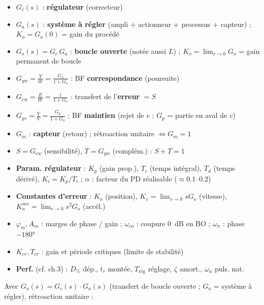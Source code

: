 
\begin{tcolorbox}[colback=ch6teal!5,colframe=ch6teal!80!black,title={Notations (rappel cours)}]
\begin{itemize}
  \item $G_c(s)$ : \textbf{r\'egulateur} (correcteur)
  \item $G_a(s)$ : \textbf{syst\`eme \`a r\'egler} (ampli + actionneur + processus + capteur) ; $K_a{=}G_a(0)$ = gain du proc\'ed\'e
  \item $G_o(s)=G_c\,G_a$ : \textbf{boucle ouverte} (not\'ee aussi $L$) ; $K_o{=}\lim_{s\to0}G_o$ = gain permanent de boucle
  \item $G_{yw}=\frac{Y}{W}=\frac{G_o}{1+G_o}$ : BF \textbf{correspondance} (poursuite)
  \item $G_{ew}=\frac{E}{W}=\frac{1}{1+G_o}$ : transfert de l'\textbf{erreur} $=S$
  \item $G_{yv}=\frac{Y}{V}=\frac{G_p}{1+G_o}$ : BF \textbf{maintien} (rejet de $v$ ; $G_p$ = partie en aval de $v$)
  \item $G_m$ : \textbf{capteur} (retour) ; r\'etroaction unitaire $\Leftrightarrow G_m{=}1$
  \item $S=G_{ew}$ (sensibilit\'e), $T=G_{yw}$ (compl\'em.) : $S+T=1$
  \item \textbf{Param. r\'egulateur} : $K_p$ (gain prop.), $T_i$ (temps int\'egral), $T_d$ (temps d\'eriv\'e), $K_i{=}K_p/T_i$ ; $\alpha$ : facteur du PD r\'ealisable ($\approx0.1$--$0.2$)
  \item \textbf{Constantes d'erreur} : $K_o$ (position), $K_v{=}\lim_{s\to0}sG_o$ (vitesse), $K_a^{\text{acc}}{=}\lim_{s\to0}s^2G_o$ (acc\'el.)
  \item $\varphi_m, A_m$ : marges de phase / gain ; $\omega_{co}$ : coupure 0~dB en BO ; $\omega_\pi$ : phase $-180°$
  \item $K_{cr}, T_{cr}$ : gain et p\'eriode critiques (limite de stabilit\'e)
  \item \textbf{Perf.} (cf. ch.3) : $D_\%$ d\'ep., $t_r$ mont\'ee, $T_{\text{r\'eg}}$ r\'eglage, $\zeta$ amort., $\omega_n$ puls. nat.
\end{itemize}
\end{tcolorbox}

\begin{tcolorbox}[colback=ch6teal!5,colframe=ch6teal!80!black,title={Transferts en boucle ferm\'ee}]
Avec $G_o(s) = G_c(s) \cdot G_a(s)$ (transfert de boucle ouverte ; $G_a$ = syst\`eme \`a r\'egler), r\'etroaction unitaire :
\end{tcolorbox}


